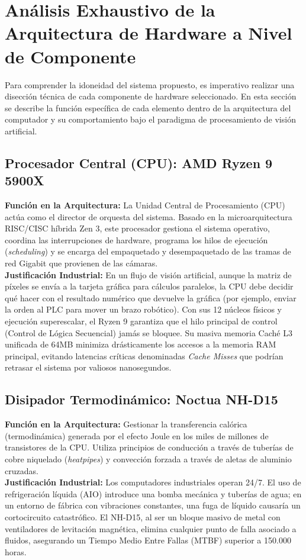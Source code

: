 \documentclass[12pt,letterpaper]{article}
\begin{document}
\renewcommand{\arraystretch}{1.0}

\newpage
\section{Análisis Exhaustivo de la Arquitectura de Hardware a Nivel de Componente}
Para comprender la idoneidad del sistema propuesto, es imperativo realizar una disección técnica de cada componente de hardware seleccionado. En esta sección se describe la función específica de cada elemento dentro de la arquitectura del computador y su comportamiento bajo el paradigma de procesamiento de visión artificial.

\subsection{Procesador Central (CPU): AMD Ryzen 9 5900X}
\textbf{Función en la Arquitectura:} La Unidad Central de Procesamiento (CPU) actúa como el director de orquesta del sistema. Basado en la microarquitectura RISC/CISC híbrida Zen 3, este procesador gestiona el sistema operativo, coordina las interrupciones de hardware, programa los hilos de ejecución (\textit{scheduling}) y se encarga del empaquetado y desempaquetado de las tramas de red Gigabit que provienen de las cámaras.
\\
\textbf{Justificación Industrial:} En un flujo de visión artificial, aunque la matriz de píxeles se envía a la tarjeta gráfica para cálculos paralelos, la CPU debe decidir qué hacer con el resultado numérico que devuelve la gráfica (por ejemplo, enviar la orden al PLC para mover un brazo robótico). Con sus 12 núcleos físicos y ejecución superescalar, el Ryzen 9 garantiza que el hilo principal de control (Control de Lógica Secuencial) jamás se bloquee. Su masiva memoria Caché L3 unificada de 64MB minimiza drásticamente los accesos a la memoria RAM principal, evitando latencias críticas denominadas \textit{Cache Misses} que podrían retrasar el sistema por valiosos nanosegundos.

\subsection{Disipador Termodinámico: Noctua NH-D15}
\textbf{Función en la Arquitectura:} Gestionar la transferencia calórica (termodinámica) generada por el efecto Joule en los miles de millones de transistores de la CPU. Utiliza principios de conducción a través de tuberías de cobre niquelado (\textit{heatpipes}) y convección forzada a través de aletas de aluminio cruzadas.
\\
\textbf{Justificación Industrial:} Los computadores industriales operan 24/7. El uso de refrigeración líquida (AIO) introduce una bomba mecánica y tuberías de agua; en un entorno de fábrica con vibraciones constantes, una fuga de líquido causaría un cortocircuito catastrófico. El NH-D15, al ser un bloque masivo de metal con ventiladores de levitación magnética, elimina cualquier punto de falla asociado a fluidos, asegurando un Tiempo Medio Entre Fallas (MTBF) superior a 150.000 horas.
\end{document}
